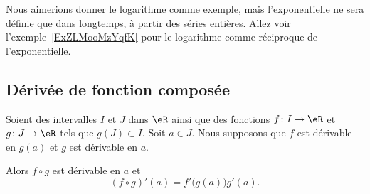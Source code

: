 \begin{example}
	Nous aimerions donner le logarithme comme exemple, mais l'exponentielle ne sera définie que dans longtemps, à partir des séries entières. Allez voir l'exemple~\ref{ExZLMooMzYqfK} pour le logarithme comme réciproque de l'exponentielle.
\end{example}

\subsection{Dérivée de fonction composée}

\begin{proposition}       \label{PROPooDONLooWthqRR}
	Soient des intervalles \( I\) et \( J\) dans \( \eR\) ainsi que des fonctions \( f\colon I\to \eR\) et \( g\colon J\to \eR\) tels que \( g(J)\subset I\). Soit \( a\in J\). Nous supposons que \( f\) est dérivable en \( g(a)\) et \( g\) est dérivable en \( a\).

	Alors \( f\circ g\) est dérivable en \( a\) et
	\begin{equation}
		(f\circ g)'(a)=f'\big( g(a) \big)g'(a).
	\end{equation}
\end{proposition}

